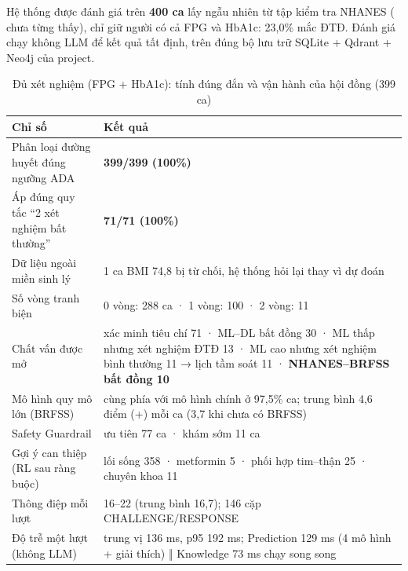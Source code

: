 Hệ thống được đánh giá trên \textbf{400 ca} lấy ngẫu nhiên từ tập kiểm tra NHANES ( chưa từng thấy), chỉ giữ người có cả FPG và HbA1c: 23,0\% mắc ĐTĐ. Đánh giá chạy không LLM để kết quả tất định, trên đúng bộ lưu trữ SQLite + Qdrant + Neo4j của project.

\begin{table}[H]
\centering
\caption{Đủ xét nghiệm (FPG + HbA1c): tính đúng đắn và vận hành của hội đồng (399 ca)}
\label{tab:k1}
\small
\begin{tabularx}{\linewidth}{@{}L{5.6cm}Y@{}}
\toprule
\textbf{Chỉ số} & \textbf{Kết quả} \\
\midrule
Phân loại đường huyết đúng ngưỡng ADA & \textbf{399/399 (100\%)} \\
Áp đúng quy tắc ``2 xét nghiệm bất thường'' & \textbf{71/71 (100\%)} \\
Dữ liệu ngoài miền sinh lý & 1 ca BMI 74,8 bị từ chối, hệ thống hỏi lại thay vì dự đoán \\
Số vòng tranh biện & 0 vòng: 288 ca · 1 vòng: 100 · 2 vòng: 11 \\
Chất vấn được mở & xác minh tiêu chí 71 · ML–DL bất đồng 30 · ML thấp nhưng xét nghiệm ĐTĐ 13 · ML cao nhưng xét nghiệm bình thường 11 → lịch tầm soát 11 · \textbf{NHANES–BRFSS bất đồng 10} \\
Mô hình quy mô lớn (BRFSS) & cùng phía với mô hình chính ở 97,5\% ca; trung bình 4,6 điểm (+) mỗi ca (3,7 khi chưa có BRFSS) \\
Safety Guardrail & ưu tiên 77 ca · khám sớm 11 ca \\
Gợi ý can thiệp (RL sau ràng buộc) & lối sống 358 · metformin 5 · phối hợp tim–thận 25 · chuyên khoa 11 \\
Thông điệp mỗi lượt & 16–22 (trung bình 16,7); 146 cặp CHALLENGE/RESPONSE \\
Độ trễ một lượt (không LLM) & trung vị 136 ms, p95 192 ms; Prediction 129 ms (4 mô hình + giải thích) ‖ Knowledge 73 ms chạy song song \\
\bottomrule
\end{tabularx}
\end{table}


